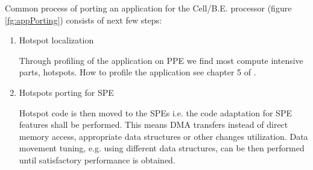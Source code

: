 Common process of porting an application for the Cell/B.E. processor (figure \ref{fg:appPorting}) consists of next few steps:
\begin{enumerate}
\item Hotspot localization
\par
Through profiling of the application on PPE we find most compute intensive parts, hotspots.
How to profile the application see chapter 5 of \cite{programmersGuide}.

\item Hotspots porting for SPE
\par
Hotspot code is then moved to the SPEs i.e. the code adaptation for SPE features shall be performed.
This means DMA transfers instead of direct memory access, appropriate data structures or other changes utilization.
Data movement tuning, e.g. using different data structures, can be then performed until satisfactory performance is obtained.
\end{enumerate}

